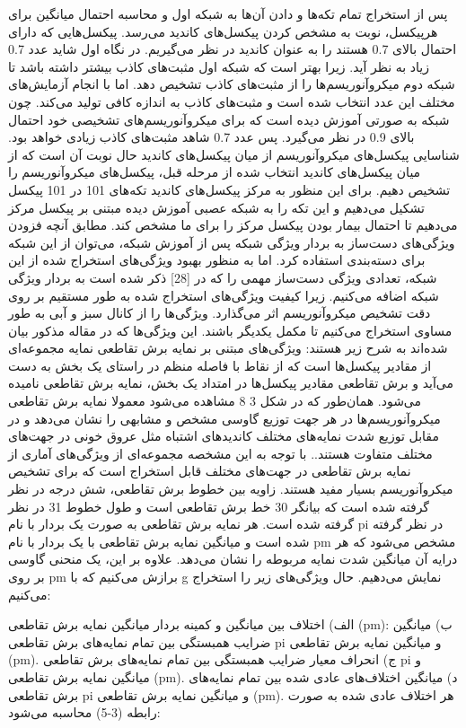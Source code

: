 پس از استخراج تمام تکه‌ها و دادن آن‌ها به شبکه اول و محاسبه احتمال میانگین برای هرپیکسل، نوبت به مشخص کردن پیکسل‌های کاندید می‌رسد. پیکسل‌هایی که دارای احتمال بالای 0.7 هستند را به عنوان کاندید در نظر می‌گیریم. 
در نگاه اول شاید عدد 0.7 زیاد به نظر آید. زیرا بهتر است که شبکه اول مثبت‌های کاذب بیشتر داشته باشد تا شبکه دوم میکروآنوریسم‌ها را از مثبت‌های کاذب تشخیص دهد. اما با انجام آزمایش‌های مختلف این عدد انتخاب شده است و مثبت‌های کاذب به اندازه کافی تولید می‌کند. چون شبکه به صورتی آموزش دیده است که برای میکروآنوریسم‌های تشخیصی خود احتمال بالای 0.9 در نظر می‌گیرد. پس عدد 0.7 شاهد مثبت‌های کاذب زیادی خواهد بود.
	شناسایی پیکسل‌های میکروآنوریسم از میان پیکسل‌های کاندید
حال نوبت آن است که از میان پیکسل‌های کاندید انتخاب شده از مرحله قبل، پیکسل‌های میکروآنوریسم را تشخیص دهیم. برای این منظور به مرکز پیکسل‌های کاندید تکه‌های 101 در 101 پیکسل تشکیل می‌دهیم و این تکه را به شبکه عصبی آموزش دیده مبتنی بر پیکسل مرکز می‌دهیم تا احتمال بیمار بودن پیکسل مرکز را برای ما مشخص کند.
مطابق آنچه فزودن ویژگی‌های دست‌ساز به بردار ویژگی شبکه
پس از آموزش شبکه، می‌توان از این شبکه برای دسته‌بندی استفاده کرد. اما به منظور بهبود ویژگی‌های استخراج شده از این شبکه، تعدادی ویژگی دست‌ساز مهمی را که در [28] ذکر شده است به بردار ویژگی شبکه اضافه می‌کنیم. زیرا کیفیت ویژگی‌های استخراج شده به طور مستقیم بر روی دقت تشخیص میکروآنوریسم اثر می‌گذارد. ویژگی‌ها را از کانال سبز و آبی به طور مساوی استخراج ‌می‌کنیم تا مکمل یکدیگر باشند. این ویژگی‌ها که در مقاله مذکور بیان شده‌اند به شرح زیر هستند:
	ویژگی‌های مبتنی بر نمایه برش تقاطعی  
نمایه مجموعه‌ای از مقادیر پیکسل‌ها است که از نقاط با فاصله منظم در راستای یک بخش به ‌دست می‌آید و برش تقاطعی مقادیر پیکسل‌ها در امتداد یک بخش، نمایه برش تقاطعی نامیده‌ می‌شود. همان‌طور که در شکل ‏3 8 مشاهده می‌شود معمولا نمایه برش تقاطعی میکروآنوریسم‌ها در هر جهت توزیع گاوسی مشخص و مشابهی را نشان می‌دهد و در مقابل توزیع شدت نمایه‌های مختلف کاندید‌های اشتباه مثل عروق خونی در جهت‌های مختلف متفاوت هستند.. با توجه به این مشخصه مجموعه‌ای از ویژگی‌های آماری از نمایه برش تقاطعی در جهت‌های مختلف قابل استخراج است که برای تشخیص میکروآنوریسم بسیار مفید هستند.
زاویه بین خطوط برش تقاطعی، شش درجه در نظر گرفته شده است که بیانگر 30 خط برش تقاطعی است و طول خطوط 31 در نظر گرفته شده است. هر نمایه برش تقاطعی به صورت یک بردار با نام pi در نظر گرفته شده است و میانگین نمایه برش تقاطعی با یک بردار با نام pm مشخص می‌شود که هر درایه آن میانگین شدت نمایه مربوطه را نشان می‌دهد. علاوه بر این، یک منحنی گاوسی بر روی pm برازش می‌کنیم که با g نمایش می‌دهیم. حال ویژگی‌های زیر را استخراج می‌کنیم:

الف) اختلاف بین میانگین و کمینه بردار میانگین نمایه برش تقاطعی (pm):
ب) میانگین ضرایب همبستگی بین تمام نمایه‌های برش تقاطعی pi و میانگین نمایه برش تقاطعی (pm).
	ج) انحراف معیار ضرایب همبستگی بین تمام نمایه‌های برش تقاطعی pi و میانگین نمایه برش تقاطعی (pm).
	د) میانگین اختلاف‌های عادی‌ شده  بین تمام نمایه‌های برش تقاطعی pi و میانگین نمایه برش تقاطعی (pm). 	هر اختلاف عادی شده به صورت رابطه (3-5) محاسبه می‌شود:


